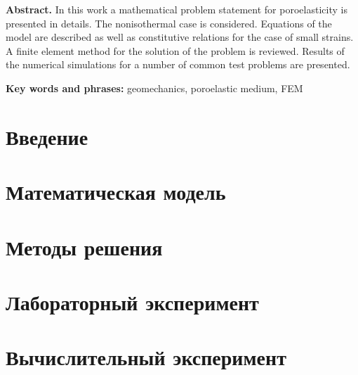 \documentclass[a4paper, 12pt]{article}
\begin{document}
\vspace*{3mm}

\noindent\textbf{ Abstract.}
In this work a mathematical problem statement for poroelasticity is
presented in details. The nonisothermal case is considered.
Equations of the model are described as well as constitutive relations
for the case of small strains. A finite element method for the
solution of the problem is reviewed. Results of the numerical
simulations for a number of common test problems are presented.



\vspace*{3mm}

\noindent\textbf{Key words and phrases:} geomechanics, poroelastic medium, FEM

\tableofcontents


\newpage

\section{Введение}
\label{sec:intro}


\section{Математическая модель}
\label{sec:mat_model}
%


\section{Методы решения}
\label{sec:methods}
%



\section{Лабораторный эксперимент}
\label{sec:experiment}
%


\section{Вычислительный  эксперимент}
\label{sec:numerical_experiment}
%

\end{document}

